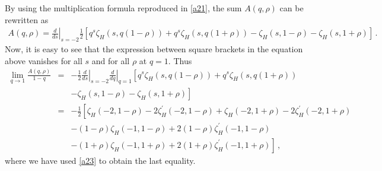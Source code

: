\documentclass[12pt,a4paper]{article}
\newcommand{\beq}{\begin{eqnarray}}
\newcommand{\eeq}{\end{eqnarray}}
\newcommand{\nn}{\nonumber}
\numberwithin{equation}{section}
\begin{document}
By using the multiplication formula reproduced in \eqref{a21}, the sum $A(q,\rho)$ can be rewritten as
\beq A(q,\rho)=\left.\frac{d}{ds}\right\vert_{s=-2} \frac{1}{2}\left[ q^s \zeta_H (s, q(1-\rho)) + q^s \zeta_H (s, q(1+\rho))- \zeta_H (s,1-\rho )- \zeta_H (s,1+\rho )\right]\nn\,. \eeq
Now, it is easy to see that the expression between square brackets in the equation above vanishes for all $s$ and for all $\rho$ at $q=1$. Thus
\beq
\lim_{q\rightarrow 1} \frac{A(q,\rho)}{1-q} &=&  -\frac12 \left.\frac{d}{ds}\right\vert_{s=-2} \left.\frac{d}{dq}\right\vert_{q=1}\left[ q^s \zeta_H (s, q(1-\rho)) + q^s \zeta_H (s, q(1+\rho))\right.\nn\\
&& -\left. \zeta_H (s,1-\rho )- \zeta_H (s,1+\rho )\right] \nn\\
& = &  -\frac12 \left[\zeta_H (-2, 1-\rho)-2\zeta_H^{\prime} (-2, 1-\rho)+\zeta_H (-2, 1+\rho)-2\zeta_H^{\prime} (-2, 1+\rho)\right.\nn\\
&& - (1-\rho)\zeta_H (-1, 1-\rho)+2(1-\rho)\zeta_H^{\prime} (-1, 1-\rho)\nn\\
&& - \left. (1+\rho)\zeta_H (-1, 1+\rho)+2(1+\rho)\zeta_H^{\prime} (-1, 1+\rho)\right]\,, \label{aesc}
\eeq
where we have used \eqref{a23} to obtain the last equality.
\end{document}
